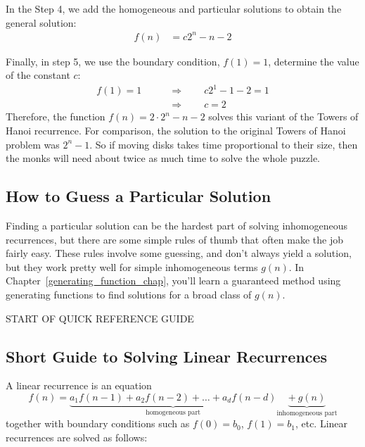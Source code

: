 In the Step 4, we add the homogeneous and particular solutions to
obtain the general solution:
\begin{align*}
f(n) & = c 2^n - n - 2
\end{align*}

Finally, in step 5, we use the boundary condition, $f(1) = 1$,
determine the value of the constant $c$:
\begin{align*}
f(1) = 1 \qquad & \Rightarrow \qquad c 2^1 - 1 - 2 = 1 \\
  & \Rightarrow \qquad c = 2
\end{align*}
Therefore, the function $f(n) = 2 \cdot 2^n - n - 2$ solves this
variant of the Towers of Hanoi recurrence.  For comparison, the
solution to the original Towers of Hanoi problem was $2^n - 1$.  So if
moving disks takes time proportional to their size, then the monks
will need about twice as much time to solve the whole puzzle.

\subsection{How to Guess a Particular Solution}


Finding a particular solution can be the hardest part of solving
inhomogeneous recurrences, but there are some simple rules of thumb
that often make the job fairly easy.  These rules involve some
guessing, and don't always yield a solution, but they work pretty well
for simple inhomogeneous terms $g(n)$.  In
Chapter~\ref{generating_function_chap}, you'll learn a guaranteed
method using generating functions to find solutions for a broad class
of $g(n)$.


\begin{center}
START OF QUICK REFERENCE GUIDE
\end{center}

\begin{center}
\subsection*{Short Guide to Solving Linear Recurrences}
\end{center}

A linear recurrence is an equation
\begin{equation*}
f(n) = \underbrace{a_1 f(n-1) + a_2 f(n-2) + \ldots + a_d f(n -
  d)}_{\text{homogeneous part}}
\underbrace{+\ g(n)}_{\text{inhomogeneous part}}
\end{equation*}
together with boundary conditions such as $f(0) = b_0$, $f(1) = b_1$,
etc.  Linear recurrences are solved as follows:

